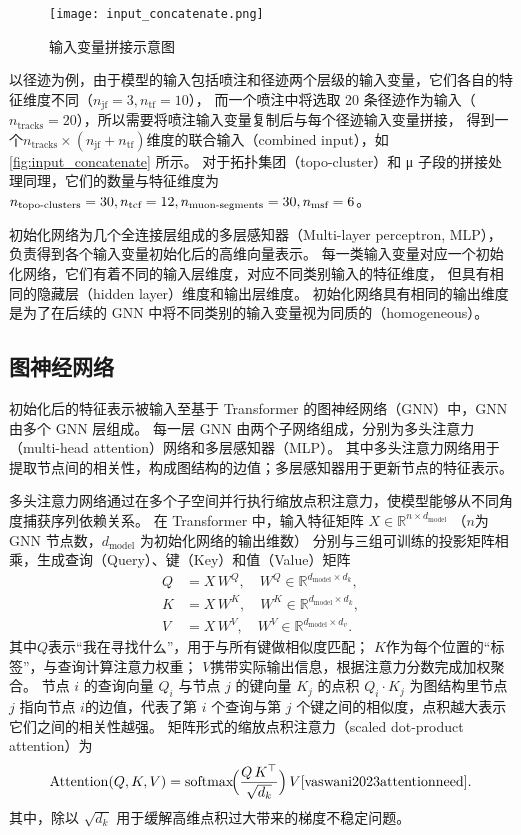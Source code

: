 \begin{figure}[ht]
    \centering
    \texttt{[image: input\_concatenate.png]}
    \caption{输入变量拼接示意图}
    \label{fig:input_concatenate}
\end{figure}

以径迹为例，由于模型的输入包括喷注和径迹两个层级的输入变量，它们各自的特征维度不同（$n_\text{jf}=3, n_\text{tf}=10$），
而一个喷注中将选取 20 条径迹作为输入（$n_\text{tracks}=20$），所以需要将喷注输入变量复制后与每个径迹输入变量拼接，
得到一个$n_\text{tracks} \times (n_\text{jf} + n_\text{tf})$维度的联合输入（combined input），如\autoref{fig:input_concatenate} 所示。
对于拓扑集团（topo-cluster）和 μ 子段的拼接处理同理，它们的数量与特征维度为
$n_\text{topo-clusters} = 30, n_\text{tcf}=12, n_\text{muon-segments}=30, n_\text{msf}=6$。

初始化网络为几个全连接层组成的多层感知器（Multi-layer perceptron, MLP），负责得到各个输入变量初始化后的高维向量表示。
每一类输入变量对应一个初始化网络，它们有着不同的输入层维度，对应不同类别输入的特征维度，
但具有相同的隐藏层（hidden layer）维度和输出层维度。
初始化网络具有相同的输出维度是为了在后续的 GNN 中将不同类别的输入变量视为同质的（homogeneous）。


\subsection{图神经网络}
初始化后的特征表示被输入至基于 Transformer 的图神经网络（GNN）中，GNN 由多个 GNN 层组成。
每一层 GNN 由两个子网络组成，分别为多头注意力（multi-head attention）网络和多层感知器（MLP）。
其中多头注意力网络用于提取节点间的相关性，构成图结构的边值；多层感知器用于更新节点的特征表示。

多头注意力网络通过在多个子空间并行执行缩放点积注意力，使模型能够从不同角度捕获序列依赖关系。
在 Transformer 中，输入特征矩阵 ${X}\in\mathbb{R}^{n\times d_{\mathrm{model}}}$
（$n$为 GNN 节点数，$d_{\mathrm{model}}$ 为初始化网络的输出维数）
分别与三组可训练的投影矩阵相乘，生成查询（Query）、键（Key）和值（Value）矩阵
\begin{align}
    {Q} & = {X}\,W^Q, \quad W^Q \in\mathbb{R}^{d_{\mathrm{model}}\times d_k}, \\
    {K} & = {X}\,W^K, \quad W^K \in\mathbb{R}^{d_{\mathrm{model}}\times d_k}, \\
    {V} & = {X}\,W^V, \quad W^V \in\mathbb{R}^{d_{\mathrm{model}}\times d_v}.
\end{align}
其中${Q}$表示“我在寻找什么”，用于与所有键做相似度匹配；
${K}$作为每个位置的“标签”，与查询计算注意力权重；
${V}$携带实际输出信息，根据注意力分数完成加权聚合。
节点 $i$ 的查询向量 ${Q}_i$ 与节点 $j$ 的键向量 ${K}_j$ 的点积 ${Q}_i \cdot {K}_j$
为图结构里节点 $j$ 指向节点 $i$的边值，代表了第 $i$ 个查询与第 $j$ 个键之间的相似度，点积越大表示它们之间的相关性越强。
矩阵形式的缩放点积注意力（scaled dot-product attention）为
\begin{align}
    \mathrm{Attention}({Q},{K},{V})
    = \mathrm{softmax}\!\Bigl(\frac{{Q}\,{K}^\top}{\sqrt{d_k}}\Bigr)\,{V}
    \cite{vaswani2023attentionneed}.
\end{align}
其中，除以 $\sqrt{d_k}$ 用于缓解高维点积过大带来的梯度不稳定问题。

